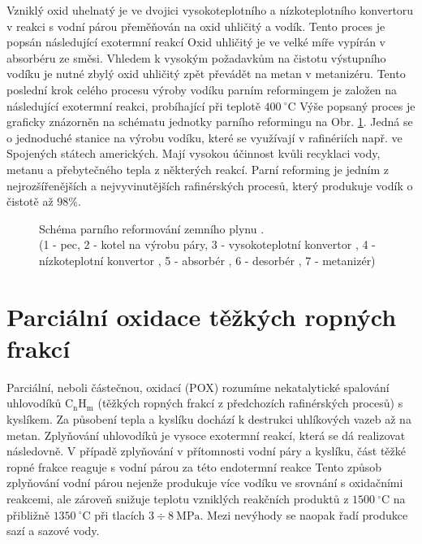 \noindent
Vzniklý oxid uhelnatý je ve dvojici vysokoteplotního a nízkoteplotního konvertoru v reakci s vodní párou přeměňován na oxid uhličitý a vodík. Tento proces je popsán následující exotermní reakcí \cite{Blazek2006}
Oxid uhličitý je ve velké míře vypírán v absorbéru ze směsi. Vhledem k vysokým požadavkům na čistotu výstupního vodíku je nutné zbylý oxid uhličitý zpět převádět na metan v metanizéru. Tento poslední krok celého procesu výroby vodíku parním reformingem je založen na následující exotermní reakci, probíhající při teplotě $400\ \mathrm{^{\circ}C}$ \cite{Blazek2006}
Výše popsaný proces je graficky znázorněn na schématu jednotky parního reformingu na Obr. \ref{fig:smr_schema}. Jedná se o jednoduché stanice na výrobu vodíku, které se využívají v rafinériích např. ve Spojených státech amerických. \cite{Seddon2022,Byrum2021} Mají vysokou účinnost kvůli recyklaci vody, metanu a přebytečného tepla z některých reakcí. Parní reforming je jedním z nejrozšířenějších a nejvyvinutějších rafinérských procesů, který produkuje vodík o čistotě až $98\%$. \cite{Seddon2022,Blazek2006}
\begin{figure}[h]
    \centering
    
    \caption[Schéma parního reformování zemního plynu]{Schéma parního reformování zemního plynu \cite{Blazek2006}.\\(1 - pec, 2 - kotel na výrobu páry, 3 - vysokoteplotní konvertor , 4 - nízkoteplotní konvertor , 5 - absorbér , 6 - desorbér , 7 - metanizér)} \label{fig:smr_schema}
\end{figure}

\section{Parciální oxidace těžkých ropných frakcí}

Parciální, neboli částečnou, oxidací (\acs{POX}) rozumíme nekatalytické spalování uhlovodíků $\mathrm{C_nH_m}$ (těžkých ropných frakcí z předchozích rafinérských procesů) s kyslíkem. Za působení tepla a kyslíku dochází k destrukci uhlíkových vazeb až na metan. Zplyňování uhlovodíků je vysoce exotermní reakcí, která se dá realizovat následovně. \cite{Seddon2022,Blazek2006}
V případě zplyňování v přítomnosti vodní páry a kyslíku, část těžké ropné frakce reaguje s vodní párou za této endotermní reakce \cite{Blazek2006}
Tento způsob zplyňování vodní párou nejenže produkuje více vodíku ve srovnání s oxidačními reakcemi, ale zároveň snižuje teplotu vzniklých reakčních produktů z $1500\ \mathrm{^{\circ}C}$ na přibližně $1350\ \mathrm{^{\circ}C}$ při tlacích $3 \div 8\ \mathrm{MPa}$. Mezi nevýhody se naopak řadí produkce sazí a sazové vody.

